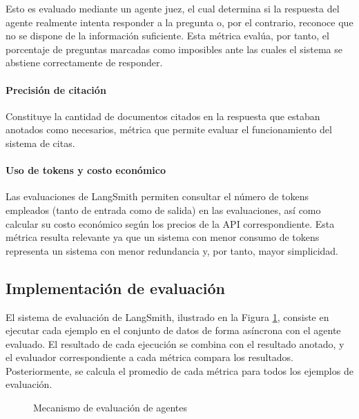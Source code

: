 Esto es evaluado mediante un agente juez, el cual determina si la respuesta del agente realmente intenta responder a la pregunta o, por el contrario, reconoce que no se dispone de la información suficiente. Esta métrica evalúa, por tanto, el porcentaje de preguntas marcadas como imposibles ante las cuales el sistema se abstiene correctamente de responder.

\paragraph{Precisión de citación} Constituye la cantidad de documentos citados en la respuesta que estaban anotados como necesarios, métrica que permite evaluar el funcionamiento del sistema de citas.

\paragraph{Uso de tokens y costo económico} Las evaluaciones de LangSmith permiten consultar el número de tokens empleados (tanto de entrada como de salida) en las evaluaciones, así como calcular su costo económico según los precios de la API correspondiente. Esta métrica resulta relevante ya que un sistema con menor consumo de tokens representa un sistema con menor redundancia y, por tanto, mayor simplicidad.

\subsection{Implementación de evaluación}
\label{sec:langsmith}
El sistema de evaluación de LangSmith, ilustrado en la Figura \ref{fig:mem_1}, consiste en ejecutar cada ejemplo en el conjunto de datos de forma asíncrona con el agente evaluado. El resultado de cada ejecución se combina con el resultado anotado, y el evaluador correspondiente a cada métrica compara los resultados. Posteriormente, se calcula el promedio de cada métrica para todos los ejemplos de evaluación.

\begin{figure}[h]
\centering
{}
\caption{Mecanismo de evaluación de agentes}
\label{fig:mem_1}
\end{figure}

